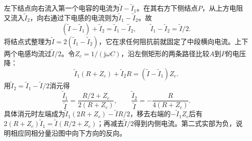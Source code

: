 \documentclass[UTF8,fontset=fandol,a4paper,11pt]{ctexart}
\begin{document}
左下结点向右流入第一个电容的电流为$\widetilde I-\widetilde I_1$。在其右方下侧结点$P$，从上方电阻又流入$\widetilde I_2$，向右通过下电感的电流则为$\widetilde I_1-\widetilde I_2$。故
\[
(\widetilde I-\widetilde I_1)+\widetilde I_2
=\widetilde I_1-\widetilde I_2,
\qquad
\boxed{\widetilde I_1-\widetilde I_2=\widetilde I/2}.
\]
将结点式整理为$\widetilde I=2(\widetilde I_1-\widetilde I_2)$，它在求任何阻抗前就固定了中段横向电流。上下两个电感均流过$\widetilde I/2$。令$Z_c=1/(\mathrm j\omega C)$，沿左侧矩形的两条路径比较$A$到$P$的电压降：
\[
\widetilde I_1(R+Z_c)+\widetilde I_2R
=(\widetilde I-\widetilde I_1)Z_c.
\]
用$\widetilde I_2=\widetilde I_1-\widetilde I/2$消元得
\[
\boxed{\frac{\widetilde I_1}{\widetilde I}
=\frac{R/2+Z_c}{2(R+Z_c)}},\qquad
\frac{\widetilde I_2}{\widetilde I}
=-\frac{R}{4(R+Z_c)}.
\]
具体消元时左端成为$\widetilde I_1(2R+Z_c)-\widetilde IR/2$，移去右端的$-\widetilde I_1Z_c$后有$2(R+Z_c)\widetilde I_1=\widetilde I(R/2+Z_c)$；再减去$\widetilde I/2$得到内侧电流。第二式实部为负，说明相应同相分量沿图中向下方向的反向。
\end{document}

